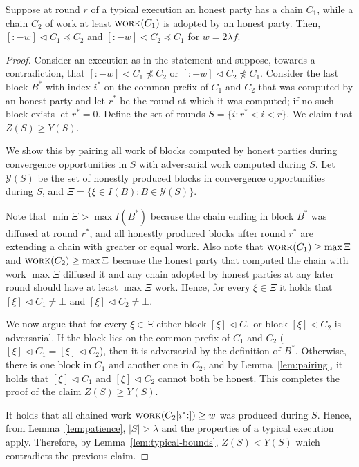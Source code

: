 \begin{lemma}
  Suppose at round $r$ of a typical execution an honest party has a chain
  $C_1$, while a chain $C_2$ of work at least $\textsc{work}(C_1)$ is adopted by an honest party.
  Then, $[{:}{-w}] \lhd C_1 \preccurlyeq C_2$ and $[{:}{-w}] \lhd C_2 \preccurlyeq C_1$
  for $w = 2 \lambda f$.
\end{lemma}
\begin{proof}
    Consider an execution as in the statement and suppose,
    towards a contradiction, that $[{:}{-w}] \lhd C_1 \not \preccurlyeq C_2$
    or $[{:}{-w}] \lhd C_2 \not \preccurlyeq C_1$.
    Consider the last block $B^*$ with index $i^*$ on the common prefix of
    $C_1$ and $C_2$ that was computed by an honest party and let $r^*$
    be the round at which it was computed; if no such block exists let $r^* = 0$.
    Define the set of rounds $S = \{i: r^* < i < r\}$. We claim that
    $Z(S) \geq Y(S)$.

    We show this by pairing all work of blocks computed by honest parties during
    convergence opportunities in $S$ with adversarial work computed during $S$.
    Let $\mathcal{Y}(S)$ be the set of honestly produced blocks in convergence opportunities
    during $S$, and $\Xi = \{\xi \in I(B): B \in \mathcal{Y}(S)\}$.

    Note that $\min{\Xi} > \max{I(B^*)}$ because the chain ending in block $B^*$
    was diffused at round $r^*$, and all honestly produced blocks after round $r^*$
    are extending a chain with greater or equal work.
    Also note that $\textsc{work}(C_1) \geq \max{\Xi}$ and $\textsc{work}(C_2) \geq \max{\Xi}$ because
    the honest party that computed the chain with work $\max \Xi$ diffused it and any chain adopted
    by honest parties at any later round should have at least $\max \Xi$ work.
    Hence, for every $\xi \in \Xi$ it holds that
    $[\xi] \lhd C_1 \neq \bot$ and $[\xi] \lhd C_2 \neq \bot$.

    We now argue that for every $\xi \in \Xi$ either block $[\xi] \lhd C_1$
    or block $[\xi] \lhd C_2$ is adversarial. If the block lies on the
    common prefix of $C_1$ and $C_2$ ($[\xi] \lhd C_1 = [\xi] \lhd C_2$),
    then it is adversarial by the definition of $B^*$. Otherwise,
    there is one block in $C_1$ and another one in $C_2$, and by
    Lemma~\ref{lem:pairing}, it holds that $[\xi] \lhd C_1$ and
    $[\xi] \lhd C_2$ cannot both be honest.
    This completes the proof of the claim $Z(S) \geq Y(S)$.

    It holds that all chained work $\textsc{work}(C_2[{i^*} {:}]) \geq w$
    was produced during $S$.
    Hence, from Lemma~\ref{lem:patience}, $|S| > \lambda$ and
    the properties of a typical execution apply.
    Therefore, by Lemma~\ref{lem:typical-bounds},
    $Z(S) < Y(S)$ which contradicts the previous claim. \Qed
\end{proof}

